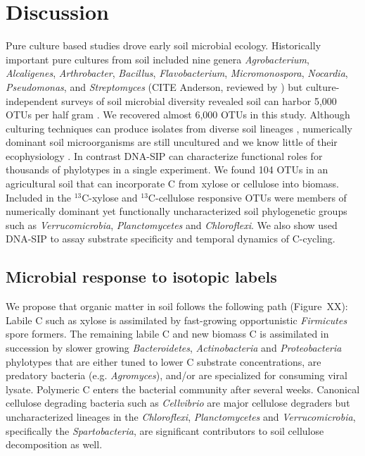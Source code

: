 \section{Discussion}
Pure culture based studies drove early soil microbial ecology. Historically
important pure cultures from soil included nine genera \textit{Agrobacterium},
\textit{Alcaligenes}, \textit{Arthrobacter}, \textit{Bacillus},
\textit{Flavobacterium}, \textit{Micromonospora}, \textit{Nocardia},
\textit{Pseudomonas}, and \textit{Streptomyces} (CITE Anderson, reviewed by
\citet{Janssen2006}) but culture-independent surveys of soil microbial
diversity revealed soil can harbor 5,000 OTUs per half gram
\citep{Schloss2006}. We recovered almost 6,000 OTUs in this study. Although
culturing techniques can produce isolates from diverse soil lineages
\citep{Janssen2002}, numerically dominant soil microorganisms are still
uncultured and we know little of their ecophysiology \citep{Janssen2006}. In
contrast DNA-SIP can characterize functional roles for thousands of phylotypes
in a single experiment. We found 104 OTUs in an agricultural soil that can
incorporate C from xylose or cellulose into biomass. Included in the
$^{13}$C-xylose and $^{13}$C-cellulose responsive OTUs were members of
numerically dominant yet functionally uncharacterized soil phylogenetic groups
such as \textit{Verrucomicrobia}, \textit{Planctomycetes} and
\textit{Chloroflexi}. We also show used DNA-SIP to assay substrate
specificity and temporal dynamics of C-cycling.

\subsection{Microbial response to isotopic labels}
We propose that organic matter in soil follows the
following path (Figure~XX): Labile C such as xylose is assimilated by
fast-growing opportunistic \textit{Firmicutes} spore formers. The remaining
labile C and new biomass C is assimilated in succession by slower
growing \textit{Bacteroidetes}, \textit{Actinobacteria} and
\textit{Proteobacteria} phylotypes that are either tuned to lower C substrate
concentrations, are predatory bacteria (e.g. \textit{Agromyces}), and/or are
specialized for consuming viral lysate. Polymeric C enters the bacterial
community after several weeks. Canonical cellulose degrading bacteria such as
\textit{Cellvibrio} are major cellulose degraders but uncharacterized lineages
in the \textit{Chloroflexi}, \textit{Planctomycetes} and
\textit{Verrucomicrobia}, specifically the \textit{Spartobacteria}, are
significant contributors to soil cellulose decomposition as well. 

